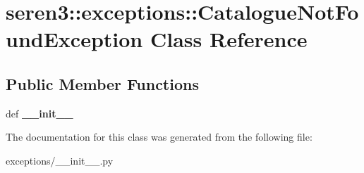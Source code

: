 \hypertarget{classseren3_1_1exceptions_1_1CatalogueNotFoundException}{
\section{seren3::exceptions::CatalogueNotFoundException Class Reference}
\label{classseren3_1_1exceptions_1_1CatalogueNotFoundException}
}
\subsection*{Public Member Functions}
\begin{DoxyCompactItemize}
\item 
\hypertarget{classseren3_1_1exceptions_1_1CatalogueNotFoundException_af20591132ce8e80794bbe8f151b0c732}{
def {\bfseries \_\-\_\-init\_\-\_\-}}
\label{classseren3_1_1exceptions_1_1CatalogueNotFoundException_af20591132ce8e80794bbe8f151b0c732}

\end{DoxyCompactItemize}


The documentation for this class was generated from the following file:\begin{DoxyCompactItemize}
\item 
exceptions/\_\-\_\-init\_\-\_\-.py\end{DoxyCompactItemize}
